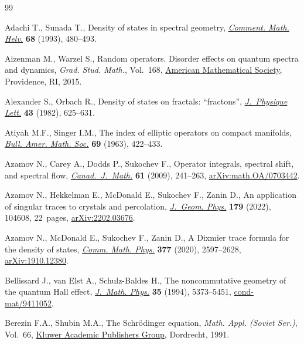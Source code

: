 \documentclass[pdftex]{sigma}
\numberwithin{equation}{section}
\begin{document}
\begin{thebibliography}{99}
\footnotesize\itemsep=0pt

Adachi T., Sunada T., Density of states in spectral geometry, \href{https://doi.org/10.1007/BF02565831}{\textit{Comment.
 Math. Helv.}} \textbf{68} (1993), 480--493.

Aizenman M., Warzel S., Random operators. Disorder effects on quantum spectra
 and dynamics, \textit{Grad. Stud. Math.}, Vol.~168, \href{https://doi.org/10.1090/gsm/168}{American Mathematical
 Society}, Providence, RI, 2015.

Alexander S., Orbach R., Density of states on fractals: ``fractons'',
 \href{https://doi.org/10.1051/jphyslet:019820043017062500}{\textit{J.~Physique Lett.}} \textbf{43} (1982), 625--631.

Atiyah M.F., Singer I.M., The index of elliptic operators on compact manifolds,
 \href{https://doi.org/10.1090/S0002-9904-1963-10957-X}{\textit{Bull. Amer. Math. Soc.}} \textbf{69} (1963), 422--433.

Azamov N., Carey A., Dodds P., Sukochev F., Operator integrals, spectral shift,
 and spectral flow, \href{https://doi.org/10.4153/CJM-2009-012-0}{\textit{Canad.~J.~Math.}} \textbf{61} (2009), 241--263,
 \href{https://arxiv.org/abs/math.OA/0703442}{arXiv:math.OA/0703442}.

Azamov N., Hekkelman E., McDonald E., Sukochev F., Zanin D., An application of
 singular traces to crystals and percolation, \href{https://doi.org/10.1016/j.geomphys.2022.104608}{\textit{J.~Geom. Phys.}}
 \textbf{179} (2022), 104608, 22~pages, \href{https://arxiv.org/abs/2202.03676}{arXiv:2202.03676}.

Azamov N., McDonald E., Sukochev F., Zanin D., A {D}ixmier trace formula for
 the density of states, \href{https://doi.org/10.1007/s00220-020-03756-7}{\textit{Comm. Math. Phys.}} \textbf{377} (2020),
 2597--2628, \href{https://arxiv.org/abs/1910.12380}{arXiv:1910.12380}.

Bellissard J., van Elst A., Schulz-Baldes H., The noncommutative geometry of
 the quantum {H}all effect, \href{https://doi.org/10.1063/1.530758}{\textit{J.~Math. Phys.}} \textbf{35} (1994),
 5373--5451, \href{https://arxiv.org/abs/cond-mat/9411052}{cond-mat/9411052}.

Berezin F.A., Shubin M.A., The {S}chr\"odinger equation, \textit{Math. Appl.
 (Soviet Ser.)}, Vol.~66, \href{https://doi.org/10.1007/978-94-011-3154-4}{Kluwer Academic Publishers Group}, Dordrecht, 1991.


\end{thebibliography}
\end{document}
